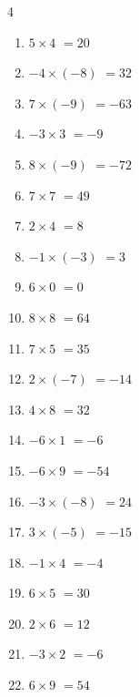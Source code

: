 \begin{multicols}{4}
\begin{enumerate}
  \item $5\times 4$
        $=20$

\columnbreak %

  \item $-4\times (-8)$
        $=32$

  \item $7\times (-9)$
        $=-63$

  \item $-3\times 3$
        $=-9$

  \item $8\times (-9)$
        $=-72$

  \item $7\times 7$
        $=49$

  \item $2\times 4$
        $=8$

  \item $-1\times (-3)$
        $=3$

  \item $6\times 0$
        $=0$

  \item $8\times 8$
        $=64$

  \item $7\times 5$
        $=35$

  \item $2\times (-7)$
        $=-14$

  \item $4\times 8$
        $=32$

  \item $-6\times 1$
        $=-6$

  \item $-6\times 9$
        $=-54$

  \item $-3\times (-8)$
        $=24$

  \item $3\times (-5)$
        $=-15$

  \item $-1\times 4$
        $=-4$

  \item $6\times 5$
        $=30$

  \item $2\times 6$
        $=12$

  \item $-3\times 2$
        $=-6$

  \item $6\times 9$
        $=54$


\end{enumerate}
\end{multicols}
